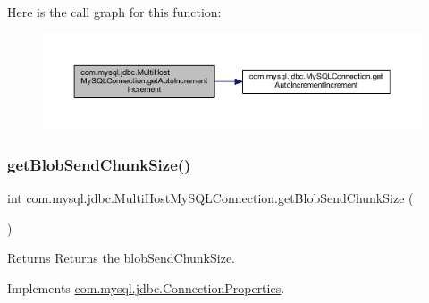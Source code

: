 Here is the call graph for this function\+:
\nopagebreak
\begin{figure}[H]
\begin{center}
\leavevmode
\includegraphics[width=350pt]{classcom_1_1mysql_1_1jdbc_1_1_multi_host_my_s_q_l_connection_a4b95550806cfbdb36263ec1e37a5c971_cgraph}
\end{center}
\end{figure}
\mbox{\label{classcom_1_1mysql_1_1jdbc_1_1_multi_host_my_s_q_l_connection_a699c99bdf14c617415353b9f1f001efa}} 
\subsubsection{\texorpdfstring{get\+Blob\+Send\+Chunk\+Size()}{getBlobSendChunkSize()}}
{\footnotesize\ttfamily int com.\+mysql.\+jdbc.\+Multi\+Host\+My\+S\+Q\+L\+Connection.\+get\+Blob\+Send\+Chunk\+Size (\begin{DoxyParamCaption}{ }\end{DoxyParamCaption})}

\begin{DoxyReturn}{Returns}
Returns the blob\+Send\+Chunk\+Size. 
\end{DoxyReturn}


Implements \mbox{\hyperlink{interfacecom_1_1mysql_1_1jdbc_1_1_connection_properties_a722ef2a90bea1ca220340a055850527f}{com.\+mysql.\+jdbc.\+Connection\+Properties}}.

